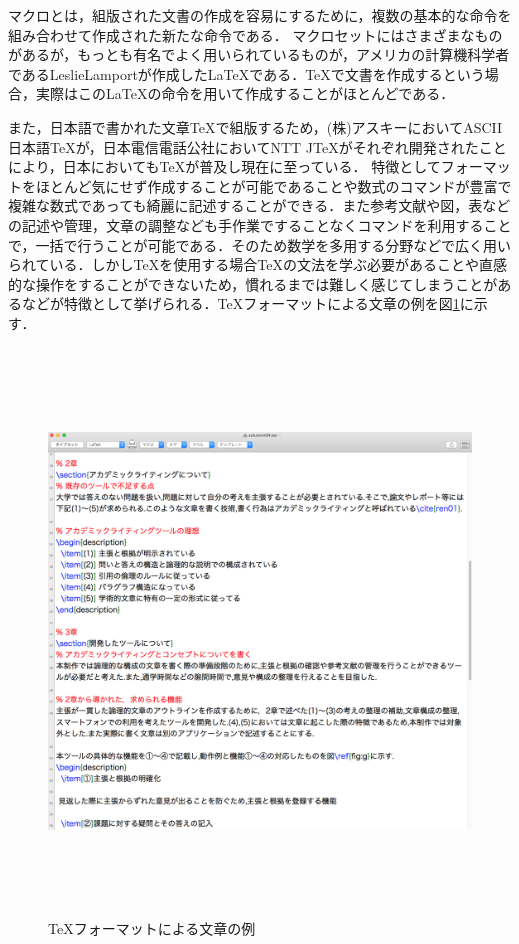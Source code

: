 \documentclass[a4j,12pt]{jarticle}
\begin{document}
マクロとは，組版された文書の作成を容易にするために，複数の基本的な命令を組み合わせて作成された新たな命令である．
マクロセットにはさまざまなものがあるが，もっとも有名でよく用いられているものが，アメリカの計算機科学者であるLeslieLamportが作成した\LaTeX である．\TeX で文書を作成するという場合，実際はこの\LaTeX の命令を用いて作成することがほとんどである．

また，日本語で書かれた文章\TeX で組版するため，(株)アスキーにおいてASCII日本語\TeX が，日本電信電話公社においてNTT J\TeX がそれぞれ開発されたことにより，日本においても\TeX が普及し現在に至っている\cite{ren3}．
特徴としてフォーマットをほとんど気にせず作成することが可能であることや数式のコマンドが豊富で複雑な数式であっても綺麗に記述することができる．また参考文献や図，表などの記述や管理，文章の調整なども手作業ですることなくコマンドを利用することで，一括で行うことが可能である．そのため数学を多用する分野などで広く用いられている．しかし\TeX を使用する場合\TeX の文法を学ぶ必要があることや直感的な操作をすることができないため，慣れるまでは難しく感じてしまうことがあるなどが特徴として挙げられる．\TeX フォーマットによる文章の例を図\ref{fig:c}に示す．

\begin{figure}[H]
\begin{center}
 \includegraphics[clip,width=150mm,height=150mm]{figure/TEX.png}
 \end{center}
 \caption{\TeX フォーマットによる文章の例}
 \label{fig:c}
\end{figure}
\end{document}
